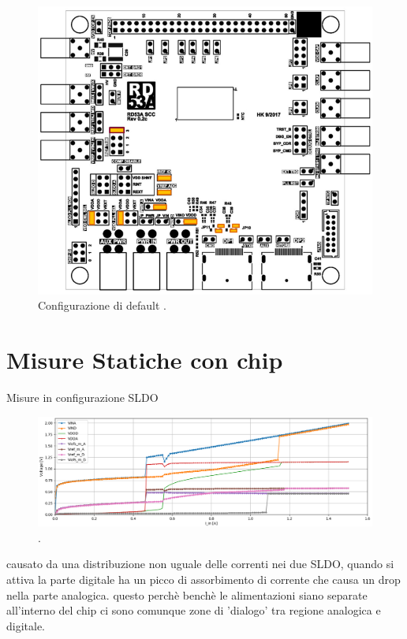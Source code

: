 \begin{figure}
\centering
\includegraphics[scale=.3]{Immagini/DirectPowering}
\caption{Configurazione di default .}
\label{DirectPowering}
\end{figure}

\section{Misure Statiche con chip}
Misure in configurazione SLDO
\begin{figure}
\centering
\includegraphics[scale=.3]{Immagini/IUI2}
\caption{.}
\label{IUI}
\end{figure}
causato da una distribuzione non uguale delle correnti nei due SLDO, quando si attiva la parte digitale ha un picco di assorbimento di corrente che causa un drop nella parte analogica. questo perchè benchè le alimentazioni siano separate all'interno del chip ci sono comunque zone di 'dialogo' tra regione analogica e digitale.



